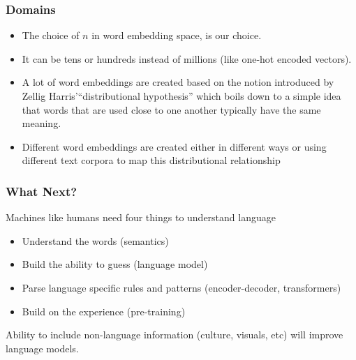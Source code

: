 \begin{frame}[fragile]\frametitle{Domains}
  \begin{itemize}
    \item The choice of $n$ in word embedding space, is our choice.
	\item It can be tens or hundreds instead of millions (like one-hot encoded vectors).
	\item A lot of word embeddings are created based on the notion introduced by Zellig Harris'``distributional hypothesis'' which boils down to a simple idea that words that are used close to one another typically have the same meaning.
	\item Different word embeddings are created either in different ways or using different text corpora to map this distributional relationship
  \end{itemize}


\end{frame}


\begin{frame}[fragile]\frametitle{What Next?}
Machines like humans need four things to understand language

\begin{itemize}
\item Understand the words (semantics)
\item Build the ability to guess (language model)
\item Parse language specific rules and patterns (encoder-decoder, transformers)
\item Build on the experience (pre-training)
\end{itemize}

Ability to include non-language information (culture, visuals, etc) will improve language models.

\end{frame}
